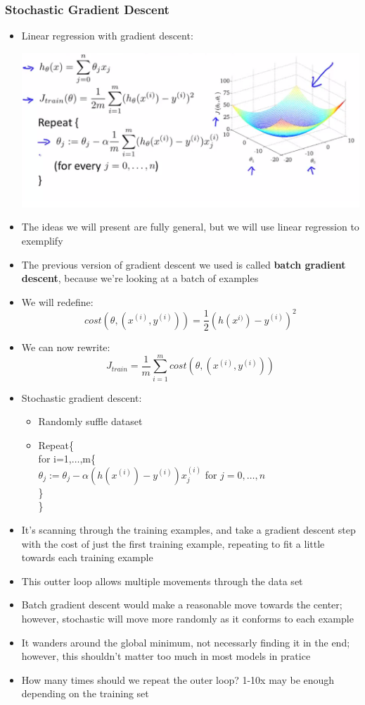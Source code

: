 \subsubsection{Stochastic Gradient Descent}
\begin{itemize}[--]
	\item Linear regression with gradient descent:
	\begin{center}
		\includegraphics[scale=0.5]{sections/cs229/w14/grad_desc.png}
	\end{center}
	\item The ideas we will present are fully general, but we will use linear regression to exemplify
	\item The previous version of gradient descent we used is called \textbf{batch gradient descent}, because we're looking at a batch of examples
	\item We will redefine:
		$$cost(\theta, (x^{(i)}, y^{(i)})) = \frac{1}{2} (h(x^{i)}) - y^{(i)})^2$$
	\item We can now rewrite:
		$$J_{train}=\frac{1}{m}\sum_{i=1}^m cost(\theta, (x^{(i)}, y^{(i)}))$$
	\item Stochastic gradient descent:
	\begin{itemize}[--]
		\item Randomly suffle dataset
		\item Repeat\{ \\
			for i=1,$\ldots$,m\{ \\
				$\theta_j := \theta_j - \alpha (h(x^{(i)}) - y^{(i)})x_j^{(i)}$ for $j=0,\ldots,n$ \\
			\} \\
		\}
	\end{itemize}
	\item It's scanning through the training examples, and take a gradient descent step with the cost of just the first training example, repeating to fit a little towards each training example
	\item This outter loop allows multiple movements through the data set
	\item Batch gradient descent would make a reasonable move towards the center; however, stochastic will move more randomly as it conforms to each example
	\item It wanders around the global minimum, not necessarly finding it in the end; however, this shouldn't matter too much in most models in pratice
	\item How many times should we repeat the outer loop? 1-10x may be enough depending on the training set
\end{itemize}

